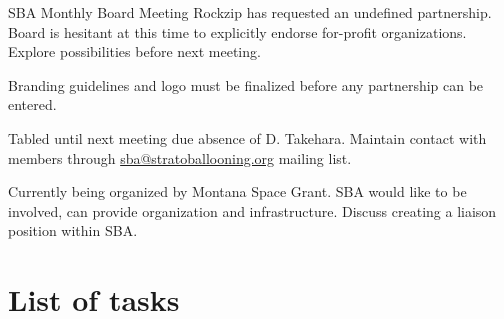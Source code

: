 \documentclass[10pt,letterpaper]{article}
\begin{document}
\begin{Minutes}{SBA Monthly Board Meeting}
Rockzip has requested an undefined partnership.
Board is hesitant at this time to explicitly endorse for-profit organizations.
Explore possibilities before next meeting.

Branding guidelines and logo must be finalized before any partnership can be entered.

Tabled until next meeting due absence of D. Takehara.
Maintain contact with members through \url{sba@stratoballooning.org} mailing list.

Currently being organized by Montana Space Grant.
SBA would like to be involved, can provide organization and infrastructure.
Discuss creating a liaison position within SBA.

\appendix

\section{List of tasks}
\listoftasks

\end{Minutes}
\end{document}
